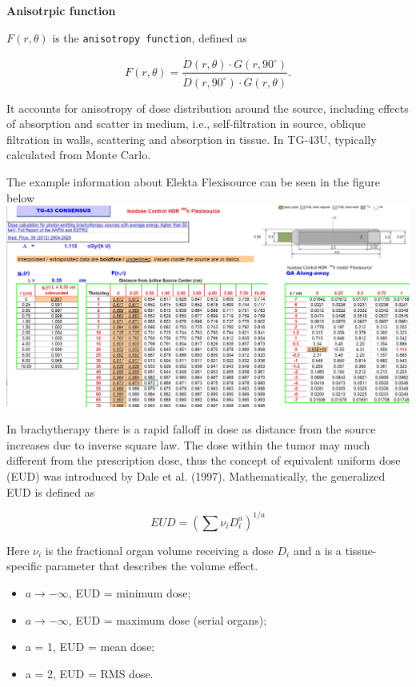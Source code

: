 \documentclass[]{book}
\providecommand{\tightlist}{%
  \setlength{\itemsep}{0pt}\setlength{\parskip}{0pt}}
\theoremstyle{definition}
\theoremstyle{definition}
\theoremstyle{definition}
\theoremstyle{remark}
\begin{document}
\textbf{Anisotrpic function}

\(F(r,\theta)\) is the \texttt{anisotropy\ function}, defined as

\begin{equation}
F(r,\theta) = \frac{\dot D(r,\theta)\cdot G(r,90^{\circ})}{\dot D(r,90^{\circ})\cdot G(r, \theta)}.
\end{equation}

It accounts for anisotropy of dose distribution around the source,
including effects of absorption and scatter in medium, i.e.,
self-filtration in source, oblique filtration in walls, scattering and
absorption in tissue. In TG-43U, typically calculated from Monte Carlo.

The example information about Elekta Flexisource can be seen in the
figure below \includegraphics{figures/Ir-192.jpg}

In brachytherapy there is a rapid falloff in dose as distance from the
source increases due to inverse square law. The dose within the tumor
may much different from the prescription dose, thus the concept of
equivalent uniform dose (EUD) was introduced by Dale et al. (1997).
Mathematically, the generalized EUD is defined as

\begin{equation*}
EUD= \left( \sum \nu_iD^a_i \right ) ^{1/a}
\end{equation*}

Here \(\nu_i\) is the fractional organ volume receiving a dose \(D_i\)
and a is a tissue-specific parameter that describes the volume effect.

\begin{itemize}
\tightlist
\item
  \(a \rightarrow -\infty\), EUD = minimum dose;
\item
  \(a \rightarrow -\infty\), EUD = maximum dose (serial organs);
\item
  a = 1, EUD = mean dose;
\item
  a = 2, EUD = RMS dose.
\end{itemize}
\end{document}
